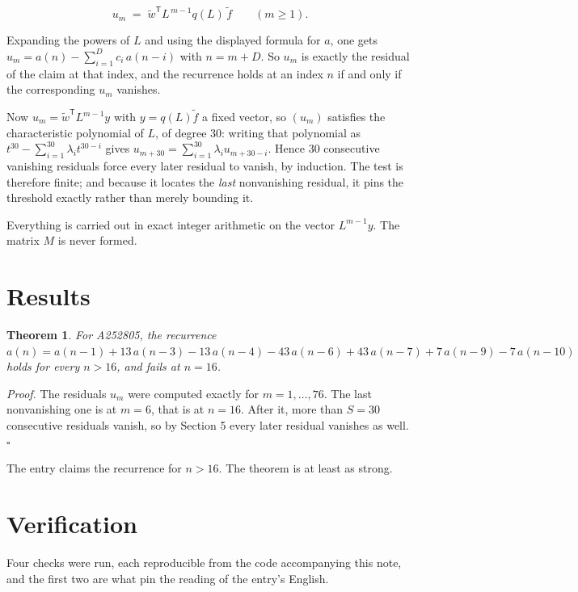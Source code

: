 \documentclass[11pt]{article}
\newtheorem{theorem}{Theorem}
\theoremstyle{definition}
\begin{document}
\[u_m \;=\; \tilde w^{\mathsf T} L^{\,m-1} q(L)\,\tilde f \qquad (m \ge 1).\]

Expanding the powers of $L$ and using the displayed formula for $a$, one gets $u_m = a(n) - \sum_{i=1}^{D} c_i\,a(n-i)$ with $n = m + D$. So $u_m$ is exactly the residual of the claim at that index, and the recurrence holds at an index $n$ if and only if the corresponding $u_m$ vanishes.

Now $u_m = \tilde w^{\mathsf T} L^{m-1} y$ with $y = q(L)\tilde f$ a fixed vector, so $(u_m)$ satisfies the characteristic polynomial of $L$, of degree $30$: writing that polynomial as $t^{30} - \sum_{i=1}^{30} \lambda_i t^{30-i}$ gives $u_{m+30} = \sum_{i=1}^{30} \lambda_i u_{m+30-i}$. Hence $30$ consecutive vanishing residuals force every later residual to vanish, by induction. The test is therefore finite; and because it locates the {\itshape last} nonvanishing residual, it pins the threshold exactly rather than merely bounding it.

Everything is carried out in exact integer arithmetic on the vector $L^{m-1}y$. The matrix $M$ is never formed.

\section{Results}

\begin{theorem} For A252805, the recurrence $a(n) = a(n-1) + 13\,a(n-3) - 13\,a(n-4) - 43\,a(n-6) + 43\,a(n-7) + 7\,a(n-9) - 7\,a(n-10)$ holds for every $n > 16$, and fails at $n = 16$.\end{theorem}

{\itshape Proof.} The residuals $u_m$ were computed exactly for $m = 1,\dots,76$. The last nonvanishing one is at $m = 6$, that is at $n = 16$. After it, more than $S = 30$ consecutive residuals vanish, so by Section 5 every later residual vanishes as well. $\square$

The entry claims the recurrence for $n > 16$. The theorem is at least as strong.

\section{Verification}

Four checks were run, each reproducible from the code accompanying this note, and the first two are what pin the reading of the entry's English.
\end{document}
